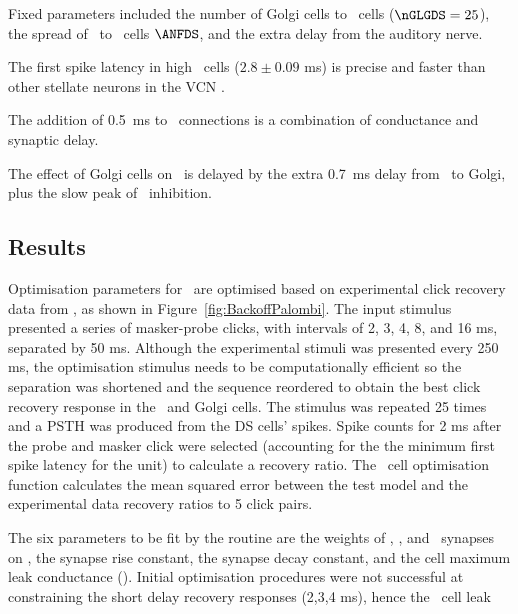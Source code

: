 Fixed parameters included  the number of Golgi cells to \DS~cells ($\nGLGDS = 25$), the spread of \ANFs~to \DS~cells $\ANFDS$, and the extra delay from the auditory nerve.

The first spike latency in high \CF \DS~cells ($2.8 \pm 0.09$ ms) is precise and faster than other stellate neurons in the VCN \citep{RhodeSmith:1986}.

The addition of 0.5~ms to \ANFDS~connections is a combination of conductance and synaptic delay.

The effect of Golgi cells on \DS~is delayed by the extra 0.7~ms delay from \ANF~to Golgi, plus the slow peak of \GABAa~inhibition.


\subsection{Results}    \label{sec:DS:results}

Optimisation parameters for \GLGDS~are optimised based on experimental click recovery data from \citep{BackoffPalombiEtAl:1997}, as shown in Figure~\ref{fig:BackoffPalombi}.
The input stimulus presented a series of masker-probe clicks, with intervals of 2, 3, 4, 8, and 16 ms, separated by 50 ms.
Although the experimental stimuli was presented every 250 ms, the optimisation stimulus needs to be computationally efficient so the separation was shortened and the sequence reordered to obtain the best click recovery response in the \DS~and Golgi cells.
The stimulus was repeated 25 times and a PSTH was produced from the DS cells' spikes.
Spike counts for 2 ms after the probe and masker click were selected (accounting for the the minimum first spike latency for the unit) to calculate a recovery ratio.
The \DS~cell optimisation function calculates the mean squared error between the test model and the experimental data recovery ratios to 5 click pairs.


The six parameters to be fit by the routine are the weights of \GLG\@, \HSR\@, and \LSR~synapses on \DS, the \GABAa synapse rise constant, the \GABAa synapse decay constant, and the \DS cell maximum leak conductance (\gleak).
Initial optimisation procedures were not successful at constraining the short delay recovery responses (2,3,4 ms), hence the \DS~cell leak %

